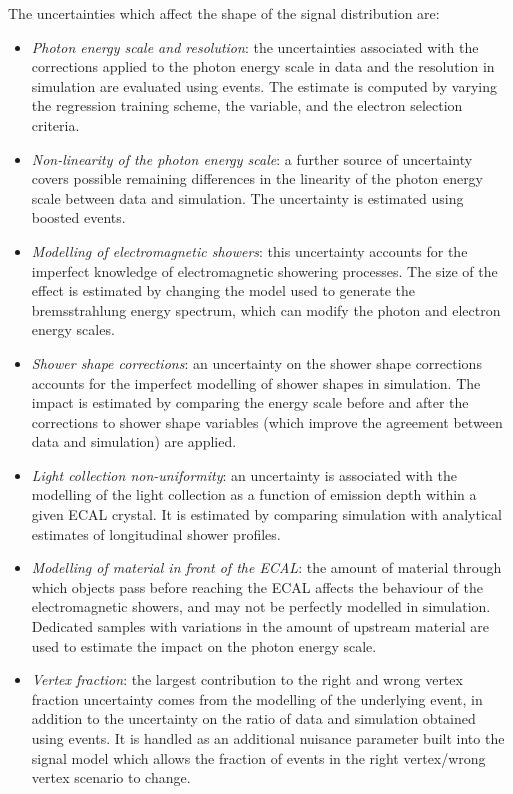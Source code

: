 The uncertainties which affect the shape of the signal \mgg distribution are:
\begin{itemize}
\item \textit{Photon energy scale and resolution}: 
  the uncertainties associated with the corrections applied to the photon energy scale in data
  and the resolution in simulation are evaluated using \Zee events.
  The estimate is computed by varying the regression training scheme, the \RNINE variable, 
  and the electron selection criteria.
\item \textit{Non-linearity of the photon energy scale}: 
  a further source of uncertainty covers possible remaining differences in the linearity 
  of the photon energy scale between data and simulation.
  The uncertainty is estimated using boosted \Zee events.
\item \textit{Modelling of electromagnetic showers}: 
  this uncertainty accounts for the imperfect knowledge of electromagnetic showering processes.
  The size of the effect is estimated by changing the model used to generate 
  the bremsstrahlung energy spectrum, which can modify the photon and electron energy scales.
\item \textit{Shower shape corrections}: 
  an uncertainty on the shower shape corrections accounts for the imperfect modelling 
  of shower shapes in simulation.
  The impact is estimated by comparing the energy scale before and after 
  the corrections to shower shape variables 
  (which improve the agreement between data and simulation) are applied.
\item \textit{Light collection non-uniformity}: 
  an uncertainty is associated with the modelling of the light collection 
  as a function of emission depth within a given ECAL crystal.
  It is estimated by comparing simulation with analytical estimates of longitudinal shower profiles.
\item \textit{Modelling of material in front of the ECAL}: 
  the amount of material through which objects pass before reaching the ECAL 
  affects the behaviour of the electromagnetic showers, 
  and may not be perfectly modelled in simulation.
  Dedicated samples with variations in the amount of upstream material are used to 
  estimate the impact on the photon energy scale.
\item \textit{Vertex fraction}: 
  the largest contribution to the right and wrong vertex fraction 
  uncertainty comes from the modelling of the underlying event, in addition to 
  the uncertainty on the ratio of data and simulation obtained using
  \Zmumu events. It is handled as an additional
  nuisance parameter built into the signal model which allows the fraction
  of events in the right vertex/wrong vertex scenario to change.
\end{itemize}

